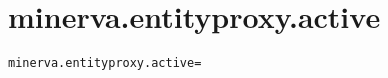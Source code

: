 \section{minerva.entityproxy.active}
\label{configuration:MinervaEntityproxyActive}
\AvailableInCsharpOnly{\TODO}
\begin{lstlisting}[style=Props,caption={Usage example for \textit{minerva.entityproxy.active}}]
minerva.entityproxy.active=
\end{lstlisting}